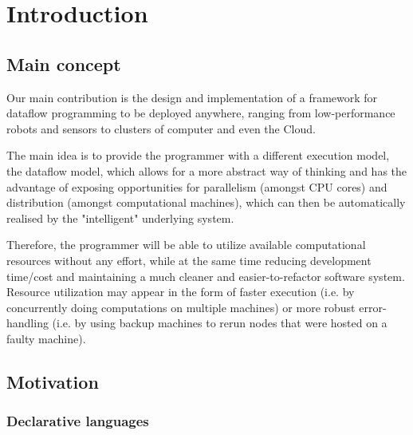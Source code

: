 \documentclass[sigplan,review,anonymous]{acmart}\settopmatter{printfolios=true,printacmref=false}
\begin{document}

\maketitle

\section{Introduction} \label{sec:introduction}

\subsection{Main concept}

Our main contribution is the design and implementation of a framework for dataflow programming to be deployed anywhere, ranging from low-performance robots and sensors to clusters of computer and even the Cloud.

The main idea is to provide the programmer with a different execution model, the dataflow model, which allows for a more abstract way of thinking and has the advantage of exposing opportunities for parallelism (amongst CPU cores) and distribution (amongst computational machines), which can then be automatically realised by the "intelligent" underlying system.

Therefore, the programmer will be able to utilize available computational resources without any effort, while at the same time reducing development time/cost and maintaining a much cleaner and easier-to-refactor software system. Resource utilization may appear in the form of faster execution (i.e. by concurrently doing computations on multiple machines) or more robust error-handling (i.e. by using backup machines to rerun nodes that were hosted on a faulty machine).

\subsection{Motivation}

\subsubsection{Declarative languages}
\end{document}
